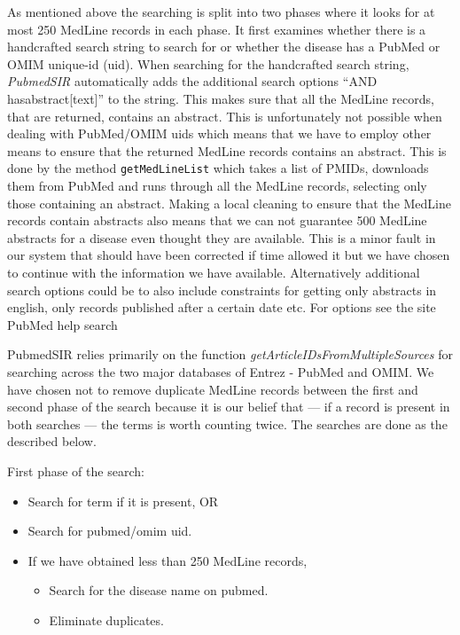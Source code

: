 As mentioned above the searching is split into two phases where it
looks for at most 250 MedLine records in each phase. It first examines
whether there is a handcrafted search string to search for or whether
the disease has a PubMed or OMIM unique-id (uid). When searching for
the handcrafted search string, \textit{PubmedSIR} automatically adds the
additional search options ``AND hasabstract[text]'' to the string. This
makes sure that all the MedLine records, that are returned, contains
an abstract. This is unfortunately not possible when dealing with
PubMed/OMIM uids which means that we have to employ other means to
ensure that the returned MedLine records contains an abstract. This is
done by the method \texttt{getMedLineList} which takes a list of
PMIDs, downloads them from PubMed and runs through all the MedLine
records, selecting only those containing an abstract. Making a local
cleaning to ensure that the MedLine records contain abstracts also
means that we can not guarantee 500 MedLine abstracts for a disease
even thought they are available. This is a minor fault in our system
that should have been corrected if time allowed it but we have chosen
to continue with the information we have available. Alternatively
additional search options could be to also include constraints for
getting only abstracts in english, only records published after a
certain date etc. For options see the site PubMed help search
\cite{PubmedHelpSearch}

PubmedSIR relies primarily on the function
\textit{getArticleIDsFromMultipleSources} for searching across the two
major databases of Entrez - PubMed and OMIM. We have chosen not to
remove duplicate MedLine records between the first and second phase of
the search because it is our belief that --- if a record is present in
both searches --- the terms is worth counting twice. The searches are
done as the described below.

First phase of the search:
\begin{itemize}

\item Search for term if it is present, OR

\item Search for pubmed/omim uid.

\item If we have obtained less than 250 MedLine records,
  
\begin{itemize}

  \item Search for the disease name on pubmed.

  \item Eliminate duplicates.

  \end{itemize}
\end{itemize}

